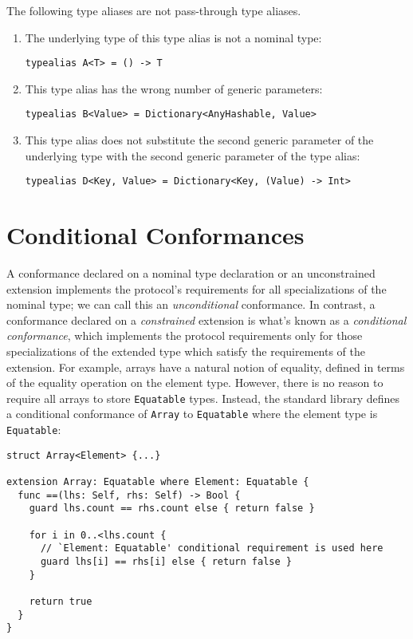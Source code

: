 \documentclass[../generics]{subfiles}
\begin{document}
\begin{example}
The following type aliases are not pass-through type aliases.
\begin{enumerate}
\item The underlying type of this type alias is not a nominal type:
\begin{verbatim}
typealias A<T> = () -> T
\end{verbatim}
\item This type alias has the wrong number of generic parameters:
\begin{verbatim}
typealias B<Value> = Dictionary<AnyHashable, Value>
\end{verbatim}
\item This type alias does not substitute the second generic parameter of the underlying type with the second generic parameter of the type alias:
\begin{verbatim}
typealias D<Key, Value> = Dictionary<Key, (Value) -> Int>
\end{verbatim}
\end{enumerate}
\end{example}

\section{Conditional Conformances}\label{conditional conformance}

A conformance declared on a nominal type declaration or an unconstrained extension implements the protocol's requirements for all specializations of the nominal type; we can call this an \emph{unconditional} conformance. In contrast, a conformance declared on a \emph{constrained} extension is what's known as a \emph{conditional conformance}, which implements the protocol requirements only for those specializations of the extended type which satisfy the requirements of the extension. For example, arrays have a natural notion of equality, defined in terms of the equality operation on the element type. However, there is no reason to require all arrays to store \texttt{Equatable} types. Instead, the standard library defines a conditional conformance of \texttt{Array} to \texttt{Equatable} where the element type is \texttt{Equatable}:
\begin{Verbatim}
struct Array<Element> {...}

extension Array: Equatable where Element: Equatable {
  func ==(lhs: Self, rhs: Self) -> Bool {
    guard lhs.count == rhs.count else { return false }

    for i in 0..<lhs.count {
      // `Element: Equatable' conditional requirement is used here
      guard lhs[i] == rhs[i] else { return false }
    }

    return true
  }
}
\end{Verbatim}
\end{document}

